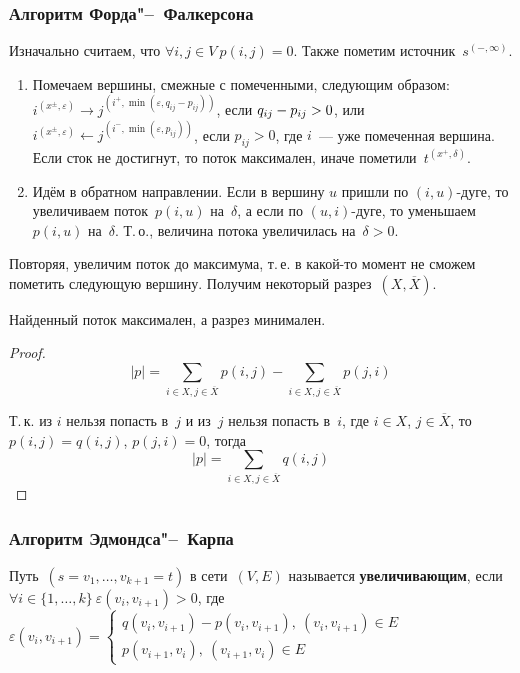 \subsubsection{Алгоритм Форда"--~Фалкерсона}
Изначально считаем, что $\forall i, j \in V \ p(i, j) = 0$.
Также пометим источник~$s^{(-, \infty)}$.
\begin{enumerate}
	\item Помечаем вершины, смежные с помеченными, следующим образом: $i^{(x^\pm, \varepsilon)} \rightarrow j^{(i^+, \min(\varepsilon, q_{ij} - p_{ij}))}$, если $q_{ij} - p_{ij} \opbr> 0$, или $i^{(x^\pm, \varepsilon)} \leftarrow j^{(i^-, \min(\varepsilon, p_{ij}))}$, если $p_{ij} > 0$, где $i$~--- уже помеченная вершина.
	Если сток не достигнут, то поток максимален, иначе пометили~$t^{(x^+, \delta)}$.
	
	\item Идём в обратном направлении.
	Если в вершину $u$ пришли по $(i, u)$-дуге, то увеличиваем поток~$p(i, u)$ на~$\delta$, а если по $(u, i)$-дуге, то уменьшаем $p(i, u)$ на~$\delta$.
	Т.\,о., величина потока увеличилась на~$\delta > 0$.
\end{enumerate}

Повторяя, увеличим поток до максимума, т.\,е. в какой-то момент не сможем пометить следующую вершину.
Получим некоторый разрез~$(X, \overline X)$.

\begin{lemma}
Найденный поток максимален, а разрез минимален.
\end{lemma}
\begin{proof}
\begin{equation*}
|p| = \sum_{i \in X, j \in \overline X} p(i, j) - \sum_{i \in X, j \in \overline X} p(j, i)
\end{equation*}

Т.\,к. из $i$ нельзя попасть в~$j$ и из~$j$ нельзя попасть в~$i$, где $i \in X$, $j \in \overline X$, то $p(i, j) = q(i, j)$, $p(j, i) = 0$, тогда
\begin{equation*}
|p| = \sum_{i \in X, j \in \overline X} q(i, j)
\end{equation*}
\end{proof}

\subsubsection{Алгоритм Эдмондса"--~Карпа}
Путь~$(s = v_1, \ldots, v_{k+1} = t)$ в сети~$(V, E)$ называется \textbf{увеличивающим}, если $\forall i \in \{ 1, \ldots, k \} \ \varepsilon(v_i, v_{i+1}) > 0$, где $\varepsilon(v_i, v_{i+1}) = \begin{cases}
q(v_i, v_{i+1}) - p(v_i, v_{i+1}), \ (v_i, v_{i+1}) \in E \\
p(v_{i+1}, v_i), \ (v_{i+1}, v_i) \in E
\end{cases}$

